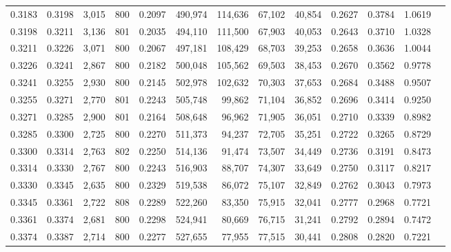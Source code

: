 \begin{tabular}{rrrrrrrrrrrrr}
0.3183 & 0.3198 &  3,015 & 800 &                                     0.2097 & 490,974 & 114,636 &  67,102 &  40,854 & 0.2627 & 0.3784 & 1.0619 \\
0.3198 & 0.3211 &  3,136 & 801 &                                     0.2035 & 494,110 & 111,500 &  67,903 &  40,053 & 0.2643 & 0.3710 & 1.0328 \\
0.3211 & 0.3226 &  3,071 & 800 &                                     0.2067 & 497,181 & 108,429 &  68,703 &  39,253 & 0.2658 & 0.3636 & 1.0044 \\
0.3226 & 0.3241 &  2,867 & 800 &                                     0.2182 & 500,048 & 105,562 &  69,503 &  38,453 & 0.2670 & 0.3562 & 0.9778 \\
0.3241 & 0.3255 &  2,930 & 800 &                                     0.2145 & 502,978 & 102,632 &  70,303 &  37,653 & 0.2684 & 0.3488 & 0.9507 \\
0.3255 & 0.3271 &  2,770 & 801 &                                     0.2243 & 505,748 &  99,862 &  71,104 &  36,852 & 0.2696 & 0.3414 & 0.9250 \\
0.3271 & 0.3285 &  2,900 & 801 &                                     0.2164 & 508,648 &  96,962 &  71,905 &  36,051 & 0.2710 & 0.3339 & 0.8982 \\
0.3285 & 0.3300 &  2,725 & 800 &                                     0.2270 & 511,373 &  94,237 &  72,705 &  35,251 & 0.2722 & 0.3265 & 0.8729 \\
0.3300 & 0.3314 &  2,763 & 802 &                                     0.2250 & 514,136 &  91,474 &  73,507 &  34,449 & 0.2736 & 0.3191 & 0.8473 \\
0.3314 & 0.3330 &  2,767 & 800 &                                     0.2243 & 516,903 &  88,707 &  74,307 &  33,649 & 0.2750 & 0.3117 & 0.8217 \\
0.3330 & 0.3345 &  2,635 & 800 &                                     0.2329 & 519,538 &  86,072 &  75,107 &  32,849 & 0.2762 & 0.3043 & 0.7973 \\
0.3345 & 0.3361 &  2,722 & 808 &                                     0.2289 & 522,260 &  83,350 &  75,915 &  32,041 & 0.2777 & 0.2968 & 0.7721 \\
0.3361 & 0.3374 &  2,681 & 800 &                                     0.2298 & 524,941 &  80,669 &  76,715 &  31,241 & 0.2792 & 0.2894 & 0.7472 \\
0.3374 & 0.3387 &  2,714 & 800 &                                     0.2277 & 527,655 &  77,955 &  77,515 &  30,441 & 0.2808 & 0.2820 & 0.7221 \\

\end{tabular}
